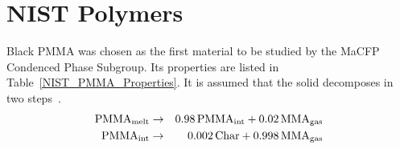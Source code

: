 \clearpage

\section{NIST Polymers}

Black PMMA was chosen as the first material to be studied by the MaCFP Condenced Phase Subgroup. Its properties are listed in Table~\ref{NIST_PMMA_Properties}. It is assumed that the solid decomposes in two steps~\cite{Fiola:FSJ2021}.
\begin{eqnarray}
   \hbox{PMMA}_{\rm melt}   &\to& 0.98 \, \hbox{PMMA}_{\rm int} + 0.02 \, \hbox{MMA}_{\rm gas}  \label{PMMA1of2} \\
   \hbox{PMMA}_{\rm int}    &\to& 0.002 \, \hbox{Char} +         0.998 \, \hbox{MMA}_{\rm gas}   \label{PMMA2of2}
\end{eqnarray}

